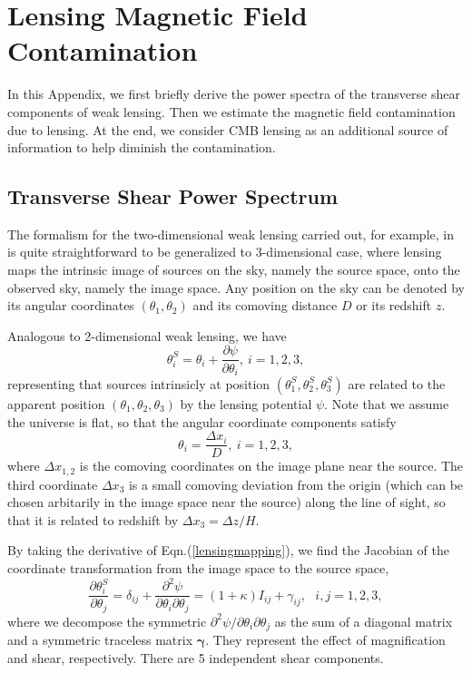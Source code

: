 \appendix
\section{Lensing Magnetic Field Contamination}
In this Appendix, we first briefly derive the power spectra of the transverse shear components of weak lensing. Then we estimate the magnetic field contamination due to lensing. At the end, we consider CMB lensing as an additional source of information to help diminish the contamination.
 
\subsection{Transverse Shear Power Spectrum}
The formalism for the two-dimensional weak lensing carried out, for example, in \cite{Weinberg201387} is quite straightforward to be generalized to 3-dimensional case, where lensing maps the intrinsic image of sources on the sky, namely the source space, onto the observed sky, namely the image space. Any position on the sky can be denoted by its angular coordinates $(\theta_1,\theta_2)$ and its comoving distance $D$ or its redshift $z$.

Analogous to 2-dimensional weak lensing, we have
\begin{equation}
\theta_i^S=\theta_i+\frac{\partial\psi}{\partial\theta_i},\ i=1,2,3,
\label{lensingmapping}
\end{equation}
representing  that sources intrinsicly at position $(\theta_1^S,\theta_2^S,\theta_3^S)$ are related to the apparent position $(\theta_1,\theta_2,\theta_3)$ by the lensing potential $\psi$. Note that we assume the universe is flat, so that the angular coordinate components satisfy
\begin{equation}
\theta_i=\frac{\Delta x_i}{D},\ i=1,2,3,
\end{equation}
where $\Delta x_{1,2}$ is the comoving coordinates on the image plane near the source. The third coordinate $\Delta x_3$ is a small comoving deviation from the origin (which can be chosen arbitarily in the image space near the source) along the line of sight, so that it is related to redshift by $\Delta x_3=\Delta z/H$.

By taking the derivative of Eqn.(\ref{lensingmapping}), we find the Jacobian of the coordinate transformation from the image space to the source space,
\begin{equation}
\frac{\partial\theta_i^S}{\partial\theta_j}=\delta_{ij}+\frac{\partial^2\psi}{\partial\theta_i\partial\theta_j}=(1+\kappa)I_{ij}+\gamma_{ij},\ \ \ i,j=1,2,3,
\label{lensingtsf}
\end{equation}
where we decompose the symmetric $\partial^2\psi/\partial\theta_i\partial\theta_j$ as the sum of a diagonal matrix and a symmetric traceless matrix $\bm{\gamma}$. They represent the effect of magnification and shear, respectively. There are 5 independent shear components.

